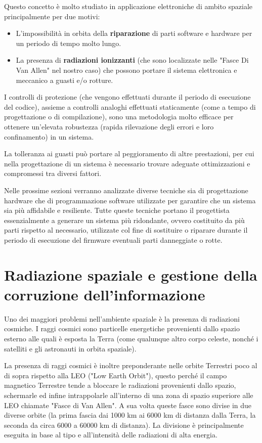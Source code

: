 \documentclass[LaM,binding=0.6cm,oneside]{../sapthesis}
\begin{document}
Questo concetto è molto studiato in applicazione elettroniche di ambito spaziale principalmente per due motivi:
\begin{itemize}
    \item L'impossibilità in orbita della \textbf{riparazione} di parti software e hardware per un periodo di tempo molto lungo.
    
    \item La presenza di \textbf{radiazioni ionizzanti} (che sono localizzate nelle "Fasce Di Van Allen" nel nostro caso) che possono portare il sistema elettronica e meccanico a guasti e/o rotture.
\end{itemize}

I controlli di protezione (che vengono effettuati durante il periodo di esecuzione del codice), assieme a controlli analoghi effettuati staticamente (come a tempo di progettazione o di compilazione), sono una metodologia molto efficace per ottenere un'elevata robustezza (rapida rilevazione degli errori e loro confinamento) in un sistema. 

La tolleranza ai guasti può portare al peggioramento di altre prestazioni, per cui nella progettazione di un sistema è necessario trovare adeguate ottimizzazioni e compromessi tra diversi fattori. 

Nelle prossime sezioni verranno analizzate diverse tecniche sia di progettazione hardware che di programmazione software utilizzate per garantire che un sistema sia più affidabile e resiliente. Tutte queste tecniche portano il progettista essenzialmente a generare un sistema più ridondante, ovvero costituito da più parti rispetto al necessario, utilizzate col fine di sostituire o riparare durante il periodo di esecuzione del firmware eventuali parti danneggiate o rotte.

\section{Radiazione spaziale e gestione della corruzione dell'informazione}

Uno dei maggiori problemi nell'ambiente spaziale è la presenza di radiazioni cosmiche.
I raggi cosmici sono particelle energetiche provenienti dallo spazio esterno alle quali è esposta la Terra (come qualunque altro corpo celeste, nonché i satelliti e gli astronauti in orbita spaziale).

La presenza di raggi cosmici è inoltre preponderante nelle orbite Terrestri poco al di sopra rispetto alla LEO ("Low Earth Orbit"), questo perché il campo magnetico Terrestre tende a bloccare le radiazioni provenienti dallo spazio, schermarle ed infine intrappolarle all'interno di una zona di spazio superiore alle LEO chiamate "Fasce di Van Allen".
A sua volta queste fasce sono divise in due diverse orbite (la prima fascia dai 1000 km ai 6000 km di distanza dalla Terra, la seconda da circa 6000 a 60000 km di distanza). La divisione è principalmente eseguita in base al tipo e all'intensità delle radiazioni di alta energia.
\end{document}

